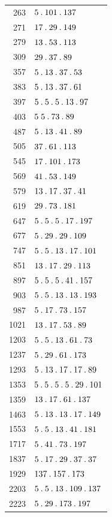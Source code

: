\begin{longtable}{@{}r|l@{}}
263 & $5\mathbin{.} 101\mathbin{.} 137$\\
271 & $17\mathbin{.} 29\mathbin{.} 149$\\
279 & $13\mathbin{.} 53\mathbin{.} 113$\\
309 & $29\mathbin{.} 37\mathbin{.} 89$\\
357 & $5\mathbin{.} 13\mathbin{.} 37\mathbin{.} 53$\\
383 & $5\mathbin{.} 13\mathbin{.} 37\mathbin{.} 61$\\
397 & $5\mathbin{.} 5\mathbin{.} 5\mathbin{.} 13\mathbin{.} 97$\\
403 & $5\;5\mathbin{.} 73\mathbin{.} 89$\\
487 & $5\mathbin{.} 13\mathbin{.} 41\mathbin{.} 89$\\
505 & $37\mathbin{.} 61\mathbin{.} 113$\\
545 & $17\mathbin{.} 101\mathbin{.} 173$\\
569 & $41\mathbin{.} 53\mathbin{.} 149$\\
579 & $13\mathbin{.} 17\mathbin{.} 37\mathbin{.} 41$\\
619 & $29\mathbin{.} 73\mathbin{.} 181$\\
647 & $5\mathbin{.} 5\mathbin{.} 5\mathbin{.} 17\mathbin{.} 197$\\
677 & $5\mathbin{.} 29\mathbin{.} 29\mathbin{.} 109$\\
747 & $5\mathbin{.} 5\mathbin{.} 13\mathbin{.} 17\mathbin{.} 101$\\
851 & $13\mathbin{.} 17\mathbin{.} 29\mathbin{.} 113$\\
897 & $5\mathbin{.} 5\mathbin{.} 5\mathbin{.} 41\mathbin{.} 157$\\
903 & $5\mathbin{.} 5\mathbin{.} 13\mathbin{.} 13\mathbin{.} 193$\\
987 & $5\mathbin{.} 17\mathbin{.} 73\mathbin{.} 157$\\
1021 & $13\mathbin{.} 17\mathbin{.} 53\mathbin{.} 89$\\
1203 & $5\mathbin{.} 5\mathbin{.} 13\mathbin{.} 61\mathbin{.} 73$\\
1237 & $5\mathbin{.} 29\mathbin{.} 61\mathbin{.} 173$\\
1293 & $5\mathbin{.} 13\mathbin{.} 17\mathbin{.} 17\mathbin{.} 89$\\
1353 & $5\mathbin{.} 5\mathbin{.} 5\mathbin{.} 5\mathbin{.} 29\mathbin{.} 101$\\
1359 & $13\mathbin{.} 17\mathbin{.} 61\mathbin{.} 137$\\
1463 & $5\mathbin{.} 13\mathbin{.} 13\mathbin{.} 17\mathbin{.} 149$\\
1553 & $5\mathbin{.} 5\mathbin{.} 13\mathbin{.} 41\mathbin{.} 181$\\
1717 & $5\mathbin{.} 41\mathbin{.} 73\mathbin{.} 197$\\
1837 & $5\mathbin{.} 17\mathbin{.} 29\mathbin{.} 37\mathbin{.} 37$\\
1929 & $137\mathbin{.} 157\mathbin{.} 173$\\
2203 & $5\mathbin{.} 5\mathbin{.} 13\mathbin{.} 109\mathbin{.} 137$\\
2223 & $5\mathbin{.} 29\mathbin{.} 173\mathbin{.} 197$\\

\end{longtable}
